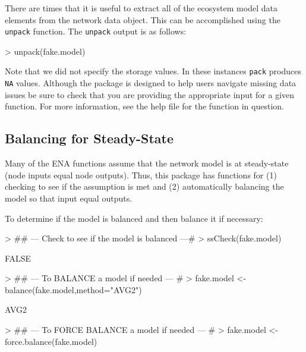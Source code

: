 \documentclass[article]{jss}
\begin{document}
There are times that it is useful to extract all of the ecosystem
model data elements from the network data object.  This can be
accomplished using the \texttt{unpack} function. The \texttt{unpack}
output is as follows:

\begin{Schunk}
\begin{Sinput}
> unpack(fake.model)
\end{Sinput}
\end{Schunk}

Note that we did not specify the storage values. In these instances
\texttt{pack} produces \texttt{NA} values. Although the package is
designed to help users navigate missing data issues be sure to check
that you are providing the appropriate input for a given function. For
more information, see the help file for the function in question.

\subsection{Balancing for Steady-State}

Many of the ENA functions assume that the network model is at
steady-state (node inputs equal node outputs).  Thus, this package has
functions for (1) checking to see if the assumption is met and (2)
automatically balancing the model so that input equal outputs.

To determine if the model is balanced and then balance it if necessary:
\begin{Schunk}
\begin{Sinput}
> ## --- Check to see if the model is balanced ---#
> ssCheck(fake.model)
\end{Sinput}
\begin{Soutput}
[1] FALSE
\end{Soutput}
\begin{Sinput}
> ## --- To BALANCE a model if needed --- #
> fake.model <- balance(fake.model,method="AVG2")
\end{Sinput}
\begin{Soutput}
[1] AVG2
\end{Soutput}
\begin{Sinput}
> ## --- To FORCE BALANCE a model if needed --- #
> fake.model <- force.balance(fake.model)
\end{Sinput}
\end{Schunk}
\end{document}
